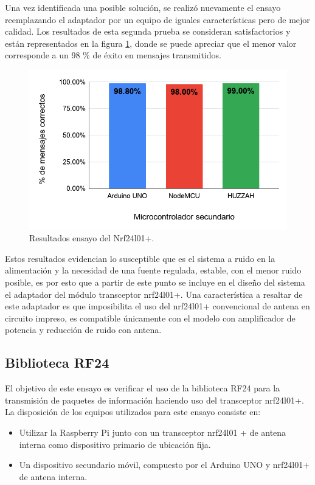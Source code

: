 Una vez identificada una posible solución, se realizó nuevamente el ensayo reemplazando el adaptador por un equipo de iguales características pero de mejor calidad. Los resultados de esta segunda prueba se consideran satisfactorios y están representados en la figura \ref{fig:figura_b}, donde se puede apreciar que el menor valor corresponde a un 98 \% de éxito en mensajes transmitidos.


\begin{figure}[ht]
	\centering
	\includegraphics[scale=.45]{./Figures/Capitulo4/Figura_B.png}
	\caption{Resultados ensayo del Nrf24l01+.}
	\label{fig:figura_b}
\end{figure}

Estos resultados evidencian lo susceptible que es el sistema a ruido en la alimentación y la necesidad de una fuente regulada, estable, con el menor ruido posible, es por esto que a partir de este punto se incluye en el diseño del sistema el adaptador del módulo transceptor nrf24l01+. Una característica a resaltar de este adaptador es que imposibilita el uso del nrf24l01+ convencional de antena en circuito impreso, es compatible únicamente con el modelo con amplificador de potencia y reducción de ruido con antena.


\subsection{Biblioteca RF24}
 

El objetivo de este ensayo es verificar el uso de la biblioteca RF24 para la transmisión de paquetes de información haciendo uso del transceptor nrf24l01+. La disposición de los equipos utilizados para este ensayo consiste en:

\begin{itemize}
\item Utilizar la Raspberry Pi junto con un transceptor nrf24l01 + de antena interna como dispositivo primario de ubicación fija.
\item Un dispositivo secundario móvil, compuesto por el Arduino UNO y nrf24l01+ de antena interna.
\end{itemize}

